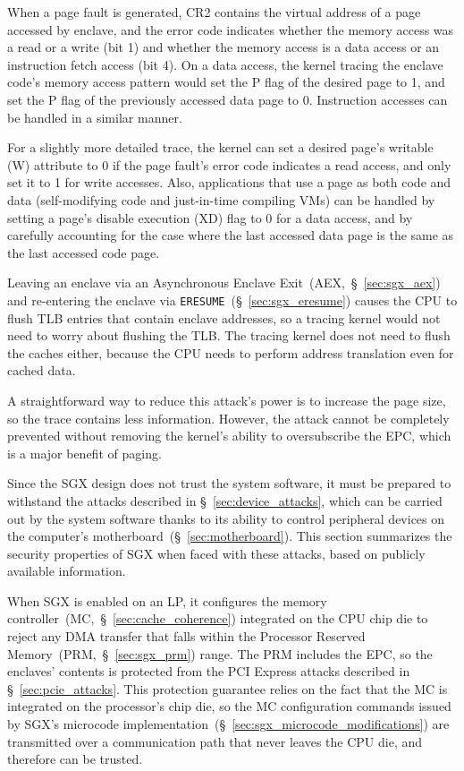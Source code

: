 When a page fault is generated, CR2 contains the virtual address of a page
accessed by enclave, and the error code indicates whether the memory access was
a read or a write (bit 1) and whether the memory access is a data access or
an instruction fetch access (bit 4). On a data access, the kernel tracing the
enclave code's memory access pattern would set the P flag of the desired page
to 1, and set the P flag of the previously accessed data page to 0. Instruction
accesses can be handled in a similar manner.

For a slightly more detailed trace, the kernel can set a desired page's
writable (W) attribute to 0 if the page fault's error code indicates a read
access, and only set it to 1 for write accesses. Also, applications that use a
page as both code and data (self-modifying code and just-in-time compiling VMs)
can be handled by setting a page's disable execution (XD) flag to 0 for a data
access, and by carefully accounting for the case where the last accessed data
page is the same as the last accessed code page.

Leaving an enclave via an Asynchronous Enclave Exit~(AEX,~\S~\ref{sec:sgx_aex})
and re-entering the enclave via \texttt{ERESUME}~(\S~\ref{sec:sgx_eresume})
causes the CPU to flush TLB entries that contain enclave addresses, so a
tracing kernel would not need to worry about flushing the TLB. The tracing
kernel does not need to flush the caches either, because the CPU needs to
perform address translation even for cached data.

A straightforward way to reduce this attack's power is to increase the page
size, so the trace contains less information. However, the attack cannot be
completely prevented without removing the kernel's ability to oversubscribe the
EPC, which is a major benefit of paging.


\label{sec:sgx_vs_device_attacks}

Since the SGX design does not trust the system software, it must be prepared to
withstand the attacks described in \S~\ref{sec:device_attacks}, which can be
carried out by the system software thanks to its ability to control peripheral
devices on the computer's motherboard~(\S~\ref{sec:motherboard}). This section
summarizes the security properties of SGX when faced with these attacks, based
on publicly available information.

When SGX is enabled on an LP, it configures the memory
controller~(MC,~\S~\ref{sec:cache_coherence}) integrated on the CPU chip die to
reject any DMA transfer that falls within the Processor Reserved
Memory~(PRM,~\S~\ref{sec:sgx_prm}) range. The PRM includes the EPC, so the
enclaves' contents is protected from the PCI Express attacks described in
\S~\ref{sec:pcie_attacks}. This protection guarantee relies on the fact that
the MC is integrated on the processor's chip die, so the MC configuration
commands issued by SGX's microcode
implementation~(\S~\ref{sec:sgx_microcode_modifications}) are transmitted over
a communication path that never leaves the CPU die, and therefore can be
trusted.

